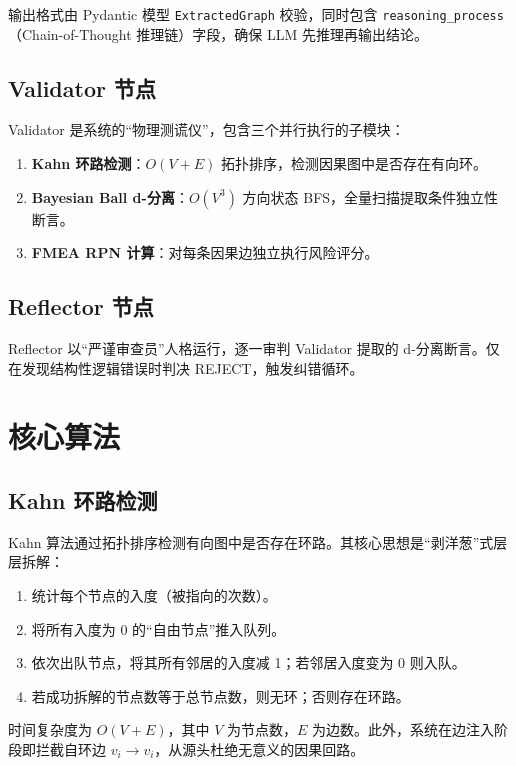 \documentclass[12pt, a4paper]{ctexart}
\begin{document}
输出格式由 Pydantic 模型 \texttt{ExtractedGraph} 校验，同时包含 \texttt{reasoning\_process}（Chain-of-Thought 推理链）字段，确保 LLM 先推理再输出结论。

\subsection{Validator 节点}

Validator 是系统的``物理测谎仪''，包含三个并行执行的子模块：
\begin{enumerate}[label=(\arabic*)]
  \item \textbf{Kahn 环路检测}：$O(V+E)$ 拓扑排序，检测因果图中是否存在有向环。
  \item \textbf{Bayesian Ball d-分离}：$O(V^3)$ 方向状态 BFS，全量扫描提取条件独立性断言。
  \item \textbf{FMEA RPN 计算}：对每条因果边独立执行风险评分。
\end{enumerate}

\subsection{Reflector 节点}

Reflector 以``严谨审查员''人格运行，逐一审判 Validator 提取的 d-分离断言。仅在发现结构性逻辑错误时判决 REJECT，触发纠错循环。

\section{核心算法}

\subsection{Kahn 环路检测}

Kahn 算法通过拓扑排序检测有向图中是否存在环路。其核心思想是``剥洋葱''式层层拆解：

\begin{enumerate}
  \item 统计每个节点的入度（被指向的次数）。
  \item 将所有入度为 0 的``自由节点''推入队列。
  \item 依次出队节点，将其所有邻居的入度减 1；若邻居入度变为 0 则入队。
  \item 若成功拆解的节点数等于总节点数，则无环；否则存在环路。
\end{enumerate}

时间复杂度为 $O(V+E)$，其中 $V$ 为节点数，$E$ 为边数。此外，系统在边注入阶段即拦截自环边 $v_i \to v_i$，从源头杜绝无意义的因果回路。
\end{document}
